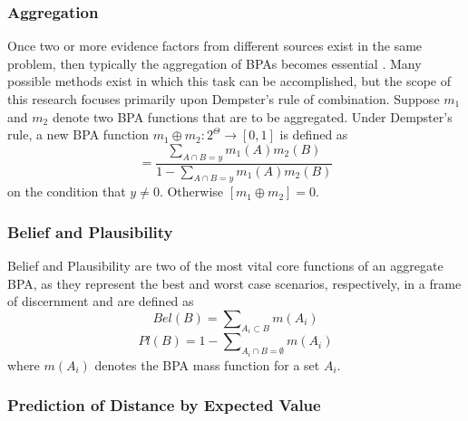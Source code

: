 \documentclass[12pt]{uthesis-v12}  %
\begin{document}
\subsubsection{Aggregation}

Once two or more evidence factors from different sources exist in the same problem, then typically the aggregation of BPAs becomes essential \cite{auer}. Many possible methods exist in which this task can be accomplished, but the scope of this research focuses primarily upon Dempster's rule of combination. Suppose $m_1$ and $m_2$ denote two BPA functions that are to be aggregated. Under Dempster's rule, a new BPA function $m_1 \oplus m_2 : 2^\Theta \rightarrow [0,1]$ is defined as \cite{al-ani}
\begin{equation}
[m_1 \oplus m_2] = \frac{\sum\nolimits_{A\cap B = y} m_1(A)m_2(B)}{1-\sum\nolimits_{A\cap B = y} m_1(A)m_2(B)}
\label{agg}
\end{equation}
\noindent on the condition that $y \neq 0$. Otherwise $[m_1 \oplus m_2] = 0$. 

\subsubsection{Belief and Plausibility}

Belief and Plausibility are two of the most vital core functions of an aggregate BPA, as they represent the best and worst case scenarios, respectively, in a frame of discernment and are defined as
\begin{equation}
Bel(B) = \sum\nolimits_{A_i \subset B} m(A_i)
\label{bel}
\end{equation}
\begin{equation}
Pl(B) = 1 - \sum\nolimits_{A_i \cap B = \emptyset} m(A_i)
\label{pl}
\end{equation}
\noindent where $m(A_i)$ denotes the BPA mass function for a set $A_i$.

\subsubsection{Prediction of Distance by Expected Value}
\end{document}
